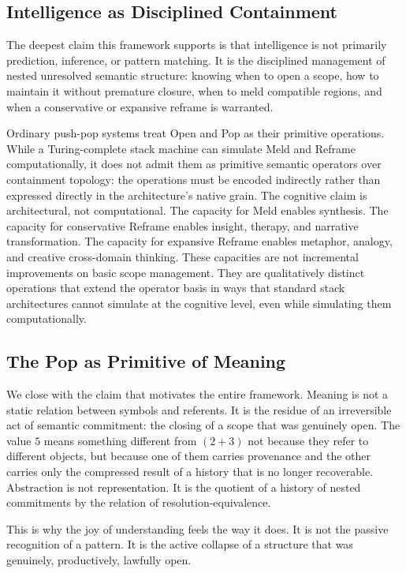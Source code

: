 \documentclass[12pt, a4paper]{article}
\theoremstyle{plain}
\theoremstyle{definition}
\theoremstyle{remark}
\begin{document}
\subsection{Intelligence as Disciplined Containment}

The deepest claim this framework supports is that intelligence is not
primarily prediction, inference, or pattern matching. It is the disciplined
management of nested unresolved semantic structure: knowing when to open a
scope, how to maintain it without premature closure, when to meld compatible
regions, and when a conservative or expansive reframe is warranted.

Ordinary push-pop systems treat Open and Pop as their primitive operations. While a Turing-complete stack machine can simulate Meld and Reframe computationally, it does not admit them as primitive semantic operators over containment topology: the operations must be encoded indirectly rather than expressed directly in the architecture's native grain. The cognitive claim is architectural, not computational. The capacity for Meld enables synthesis. The
capacity for conservative Reframe enables insight, therapy, and narrative
transformation. The capacity for expansive Reframe enables metaphor, analogy,
and creative cross-domain thinking. These capacities are not incremental
improvements on basic scope management. They are qualitatively distinct
operations that extend the operator basis in ways that standard stack
architectures cannot simulate at the cognitive level, even while simulating
them computationally.

\subsection{The Pop as Primitive of Meaning}

We close with the claim that motivates the entire framework. Meaning is not a
static relation between symbols and referents. It is the residue of an
irreversible act of semantic commitment: the closing of a scope that was
genuinely open. The value $5$ means something different from $(2 + 3)$ not
because they refer to different objects, but because one of them carries
provenance and the other carries only the compressed result of a history that
is no longer recoverable. Abstraction is not representation. It is the
quotient of a history of nested commitments by the relation of
resolution-equivalence.

This is why the joy of understanding feels the way it does. It is not the
passive recognition of a pattern. It is the active collapse of a structure
that was genuinely, productively, lawfully open.
\end{document}

